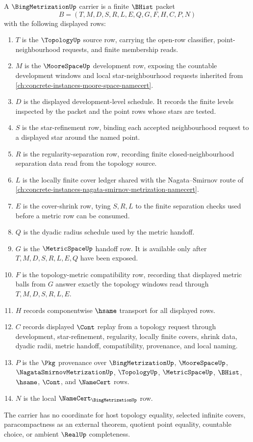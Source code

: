 \begin{definition}
\label{def:bing-metrization-carrier}
A $\BingMetrizationUp$ carrier is a finite $\BHist$ packet
$$
B=(T,M,D,S,R,L,E,Q,G,F,H,C,P,N)
$$
with the following displayed rows:
\begin{enumerate}
\item $T$ is the $\TopologyUp$ source row, carrying the open-row classifier, point-neighbourhood requests, and finite membership reads.
\item $M$ is the $\MooreSpaceUp$ development row, exposing the countable development windows and local star-neighbourhood requests inherited from \autoref{ch:concrete-instances-moore-space-namecert}.
\item $D$ is the displayed development-level schedule. It records the finite levels inspected by the packet and the point rows whose stars are tested.
\item $S$ is the star-refinement row, binding each accepted neighbourhood request to a displayed star around the named point.
\item $R$ is the regularity-separation row, recording finite closed-neighbourhood separation data read from the topology source.
\item $L$ is the locally finite cover ledger shared with the Nagata--Smirnov route of \autoref{ch:concrete-instances-nagata-smirnov-metrization-namecert}.
\item $E$ is the cover-shrink row, tying $S,R,L$ to the finite separation checks used before a metric row can be consumed.
\item $Q$ is the dyadic radius schedule used by the metric handoff.
\item $G$ is the $\MetricSpaceUp$ handoff row. It is available only after $T,M,D,S,R,L,E,Q$ have been exposed.
\item $F$ is the topology-metric compatibility row, recording that displayed metric balls from $G$ answer exactly the topology windows read through $T,M,D,S,R,L,E$.
\item $H$ records componentwise $\hsame$ transport for all displayed rows.
\item $C$ records displayed $\Cont$ replay from a topology request through development, star-refinement, regularity, locally finite covers, shrink data, dyadic radii, metric handoff, compatibility, provenance, and local naming.
\item $P$ is the $\Pkg$ provenance over $\BingMetrizationUp$, $\MooreSpaceUp$, $\NagataSmirnovMetrizationUp$, $\TopologyUp$, $\MetricSpaceUp$, $\BHist$, $\hsame$, $\Cont$, and $\NameCert$ rows.
\item $N$ is the local $\NameCert_{\BingMetrizationUp}$ row.
\end{enumerate}
The carrier has no coordinate for host topology equality, selected infinite covers, paracompactness as an external theorem, quotient point equality, countable choice, or ambient $\RealUp$ completeness.
\end{definition}


